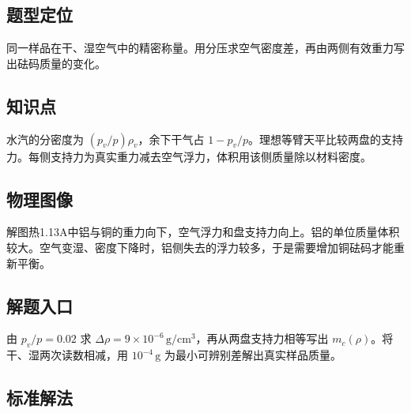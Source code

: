 \documentclass[UTF8,fontset=fandol,a4paper,11pt]{ctexart}
\begin{document}


\subsection*{题型定位}

同一样品在干、湿空气中的精密称量。用分压求空气密度差，再由两侧有效重力写出砝码质量的变化。



\subsection*{知识点}

水汽的分密度为 $(p_v/p)\rho_v$，余下干气占 $1-p_v/p$。理想等臂天平比较两盘的支持力。每侧支持力为真实重力减去空气浮力，体积用该侧质量除以材料密度。



\subsection*{物理图像}

解图热1.13A中铝与铜的重力向下，空气浮力和盘支持力向上。铝的单位质量体积较大。空气变湿、密度下降时，铝侧失去的浮力较多，于是需要增加铜砝码才能重新平衡。



\subsection*{解题入口}

由 $p_v/p=0.02$ 求 $\Delta\rho=9\times10^{-6}\,\mathrm{g/cm^3}$，再从两盘支持力相等写出 $m_c(\rho)$。将干、湿两次读数相减，用 $10^{-4}\,\mathrm g$ 为最小可辨别差解出真实样品质量。



\subsection*{标准解法}
\end{document}
